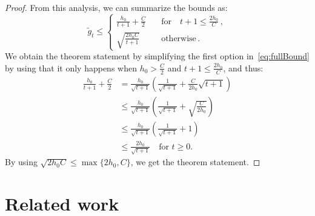 \documentclass{article}
\newcommand{\0}{\mathbf{0}} %
\begin{document}
\begin{proof}
From this analysis, we can summarize the bounds as:
\begin{equation} \label{eq:fullBound}
\tilde{g}_t \leq \left\{
\begin{aligned}
\frac{h_0}{t+1} + \frac{C}{2} \quad &\text{for} \quad t+1 \leq \frac{2 h_0}{C}   \, , \\
\sqrt{ \frac{2 h_0 C}{t+1}} \quad &\text{otherwise} \, .
\end{aligned} \right.
\end{equation}
We obtain the theorem statement by simplifying the first option in~\eqref{eq:fullBound} by using that it only happens when $h_0 > \frac{C}{2}$ and $t+1 \leq \frac{2 h_0}{C}$, and thus:
\begin{align*}
\frac{h_0}{t+1} + \frac{C}{2} &= \frac{h_0}{\sqrt{t+1}} \left( \frac{1}{\sqrt{t+1}} + \frac{C}{2h_0} \sqrt{t+1} \right) \\
&\leq \frac{h_0}{\sqrt{t+1}} \left( \frac{1}{\sqrt{t+1}} + \sqrt{\frac{C}{2h_0}} \right) \\
&\leq \frac{h_0}{\sqrt{t+1}} \left( \frac{1}{\sqrt{t+1}} + 1 \right) \\
&\leq \frac{2h_0} {\sqrt{t+1}} \quad \text{for $t\geq 0$}.
\end{align*}
By using $\sqrt{2h_0 C} \leq \max \{ 2 h_0, C \}$, we get the theorem statement.
\end{proof}

\section{Related work}
\end{document}
